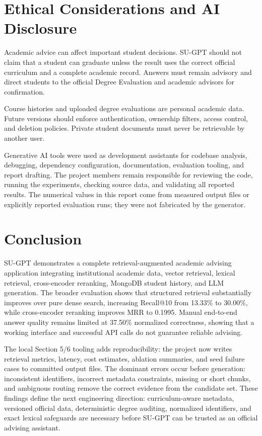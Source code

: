 \documentclass[10pt,a4paper]{article}
\begin{document}
\section{Ethical Considerations and AI Disclosure}

Academic advice can affect important student decisions. SU-GPT should not claim that a student can graduate unless the result uses the correct official curriculum and a complete academic record. Answers must remain advisory and direct students to the official Degree Evaluation and academic advisors for confirmation.

Course histories and uploaded degree evaluations are personal academic data. Future versions should enforce authentication, ownership filters, access control, and deletion policies. Private student documents must never be retrievable by another user.

Generative AI tools were used as development assistants for codebase analysis, debugging, dependency configuration, documentation, evaluation tooling, and report drafting. The project members remain responsible for reviewing the code, running the experiments, checking source data, and validating all reported results. The numerical values in this report come from measured output files or explicitly reported evaluation runs; they were not fabricated by the generator.

\section{Conclusion}

SU-GPT demonstrates a complete retrieval-augmented academic advising application integrating institutional academic data, vector retrieval, lexical retrieval, cross-encoder reranking, MongoDB student history, and LLM generation. The broader evaluation shows that structured retrieval substantially improves over pure dense search, increasing Recall@10 from 13.33\% to 30.00\%, while cross-encoder reranking improves MRR to 0.1995. Manual end-to-end answer quality remains limited at 37.50\% normalized correctness, showing that a working interface and successful API calls do not guarantee reliable advising.

The local Section 5/6 tooling adds reproducibility: the project now writes retrieval metrics, latency, cost estimates, ablation summaries, and seed failure cases to committed output files. The dominant errors occur before generation: inconsistent identifiers, incorrect metadata constraints, missing or short chunks, and ambiguous routing remove the correct evidence from the candidate set. These findings define the next engineering direction: curriculum-aware metadata, versioned official data, deterministic degree auditing, normalized identifiers, and exact lexical safeguards are necessary before SU-GPT can be trusted as an official advising assistant.
\end{document}
